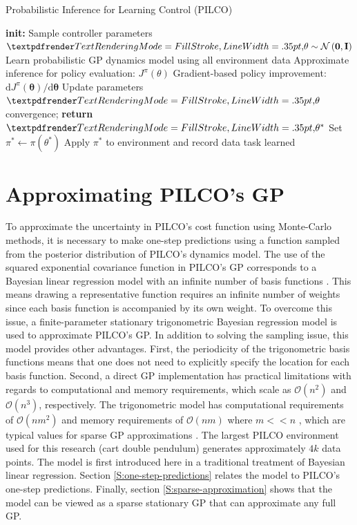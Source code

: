 \begin{algorithm}
\caption{Probabilistic Inference for Learning Control (PILCO)}\label{PILCO:algorithm-1}
\begin{algorithmic}[1]
\State \textbf{init:} Sample controller parameters $\boldgreek{\theta} \sim \mathcal{N}\left(\mathbf{0},\mathbf{I}\right)$
\Repeat{}
\State Learn probabilistic GP dynamics model using all environment data 
\Repeat{}
\State Approximate inference for policy evaluation: $J^{\pi}\left(\theta\right)$ 
\State Gradient-based policy improvement: $\mathrm{d} J^{\pi}(\boldsymbol{\theta}) / \mathrm{d} \boldsymbol{\theta}$ 
\State Update parameters $\boldgreek{\theta}$
\Until convergence; \textbf{return} $\boldgreek{\theta}^{*}$
\State Set $\pi^{*} \gets \pi\left(\theta^{*}\right)$
\State  Apply $\pi^{*}$ to environment and record data
\Until task learned 
\end{algorithmic}
\end{algorithm}

\section{Approximating PILCO's GP}
\label{S:approximating-pilcos-gp}
To approximate the uncertainty in PILCO's cost function using Monte-Carlo methods, it is necessary to make one-step predictions using a function sampled from the posterior distribution of PILCO's dynamics model. The use of the squared exponential covariance function in PILCO's GP corresponds to a Bayesian linear regression model with an infinite number of basis functions \citep{williams2006gaussian}. This means drawing a representative function requires an infinite number of weights since each basis function is accompanied by its own weight. To overcome this issue, a finite-parameter stationary trigonometric Bayesian regression model \citep{quia2010sparse} is used to approximate PILCO's GP. In addition to solving the sampling issue, this model provides other advantages. First, the periodicity of the trigonometric basis functions means that one does not need to explicitly specify the location for each basis function. Second, a direct GP implementation has practical limitations with regards to computational and memory requirements, which scale as $\mathcal{O}(n^{2})$ and $\mathcal{O}(n^{3})$, respectively. The trigonometric model has computational requirements of $\mathcal{O}(nm^{2})$ and memory requirements of $\mathcal{O}(nm)$ where $m<<n$ \citep{quia2010sparse}, which are typical values for sparse GP approximations \citep{quinonero2005unifying}. The largest PILCO environment used for this research (cart double pendulum) generates approximately $4k$ data points. The model is first introduced here in a traditional treatment of Bayesian linear regression. Section \ref{S:one-step-predictions} relates the model to PILCO's one-step predictions. Finally, section \ref{S:sparse-approximation} shows that the model can be viewed as a sparse stationary GP that can approximate any full GP.

